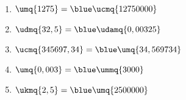 \ \\ [-5mm]
   \begin{enumerate}
      \item $\umq{1275} =\blue\ucmq{12750000}$
      \item $\udmq{32,5} =\blue\udamq{0,00325}$
      \item $\ucmq{345697,34} =\blue\umq{34,569734}$
      \item $\umq{0,003} =\blue\ummq{3000}$
      \item $\ukmq{2,5} =\blue\umq{2500000}$
   \end{enumerate}
